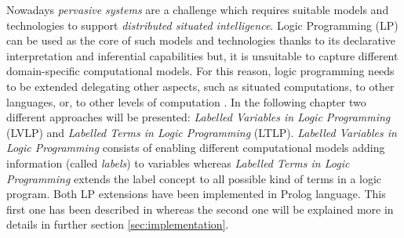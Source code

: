 Nowadays \textit{pervasive systems} are a challenge which requires suitable models and technologies to support
\textit{distributed situated intelligence}. Logic Programming (LP) can be used as the core of such models and technologies thanks to its declarative interpretation and inferential capabilities
but, it is unsuitable to capture different domain-specific computational models. For this reason, logic programming needs
to be extended delegating other aspects, such as situated computations, to other languages, or, to other levels of computation \cite{10.3233/FI-2018-1695}.\newline
In the following chapter two different approaches will be presented: \textit{Labelled Variables in Logic Programming} (LVLP) and
\textit{Labelled Terms in Logic Programming} (LTLP).\newline\newline
\textit{Labelled Variables in Logic Programming} consists of enabling different computational models adding information (called \textit{labels}) to variables
whereas \textit{Labelled Terms in Logic Programming} extends the label concept to all possible kind of terms in a logic program.\newline\newline
Both LP extensions have been implemented in Prolog language. This first one has been described in \cite{10.3233/FI-2018-1695} whereas the second one will be explained more in details in further section \ref{sec:implementation}.